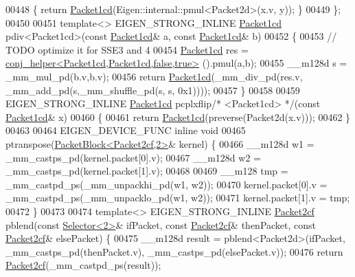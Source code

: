 \begin{DoxyCode}
00448 \textcolor{keyword}{  }\{ \textcolor{keywordflow}{return} \hyperlink{struct_eigen_1_1internal_1_1_packet1cd}{Packet1cd}(Eigen::internal::pmul<Packet2d>(x.v, y)); \}
00449 \};
00450 
00451 \textcolor{keyword}{template}<> EIGEN\_STRONG\_INLINE \hyperlink{struct_eigen_1_1internal_1_1_packet1cd}{Packet1cd} pdiv<Packet1cd>(\textcolor{keyword}{const} 
      \hyperlink{struct_eigen_1_1internal_1_1_packet1cd}{Packet1cd}& a, \textcolor{keyword}{const} \hyperlink{struct_eigen_1_1internal_1_1_packet1cd}{Packet1cd}& b)
00452 \{
00453   \textcolor{comment}{// TODO optimize it for SSE3 and 4}
00454   \hyperlink{struct_eigen_1_1internal_1_1_packet1cd}{Packet1cd} res = \hyperlink{struct_eigen_1_1internal_1_1conj__helper_3_01_packet1cd_00_01_packet1cd_00_01false_00_01true_01_4}{conj\_helper<Packet1cd,Packet1cd,false,true>}
      ().pmul(a,b);
00455   \_\_m128d s = \_mm\_mul\_pd(b.v,b.v);
00456   \textcolor{keywordflow}{return} \hyperlink{struct_eigen_1_1internal_1_1_packet1cd}{Packet1cd}(\_mm\_div\_pd(res.v, \_mm\_add\_pd(s,\_mm\_shuffle\_pd(s, s, 0x1))));
00457 \}
00458 
00459 EIGEN\_STRONG\_INLINE \hyperlink{struct_eigen_1_1internal_1_1_packet1cd}{Packet1cd} pcplxflip\textcolor{comment}{/* <Packet1cd> */}(\textcolor{keyword}{const} 
      \hyperlink{struct_eigen_1_1internal_1_1_packet1cd}{Packet1cd}& x)
00460 \{
00461   \textcolor{keywordflow}{return} \hyperlink{struct_eigen_1_1internal_1_1_packet1cd}{Packet1cd}(preverse(Packet2d(x.v)));
00462 \}
00463 
00464 EIGEN\_DEVICE\_FUNC \textcolor{keyword}{inline} \textcolor{keywordtype}{void}
00465 ptranspose(\hyperlink{struct_eigen_1_1internal_1_1_packet_block}{PacketBlock<Packet2cf,2>}& kernel) \{
00466   \_\_m128d w1 = \_mm\_castps\_pd(kernel.packet[0].v);
00467   \_\_m128d w2 = \_mm\_castps\_pd(kernel.packet[1].v);
00468 
00469   \_\_m128 tmp = \_mm\_castpd\_ps(\_mm\_unpackhi\_pd(w1, w2));
00470   kernel.packet[0].v = \_mm\_castpd\_ps(\_mm\_unpacklo\_pd(w1, w2));
00471   kernel.packet[1].v = tmp;
00472 \}
00473 
00474 \textcolor{keyword}{template}<>  EIGEN\_STRONG\_INLINE \hyperlink{struct_eigen_1_1internal_1_1_packet2cf}{Packet2cf} pblend(\textcolor{keyword}{const} \hyperlink{struct_eigen_1_1internal_1_1_selector}{Selector<2>}& ifPacket, \textcolor{keyword}{const} 
      \hyperlink{struct_eigen_1_1internal_1_1_packet2cf}{Packet2cf}& thenPacket, \textcolor{keyword}{const} \hyperlink{struct_eigen_1_1internal_1_1_packet2cf}{Packet2cf}& elsePacket) \{
00475   \_\_m128d result = pblend<Packet2d>(ifPacket, \_mm\_castps\_pd(thenPacket.v), \_mm\_castps\_pd(elsePacket.v));
00476   \textcolor{keywordflow}{return} \hyperlink{struct_eigen_1_1internal_1_1_packet2cf}{Packet2cf}(\_mm\_castpd\_ps(result));

\end{DoxyCode}
